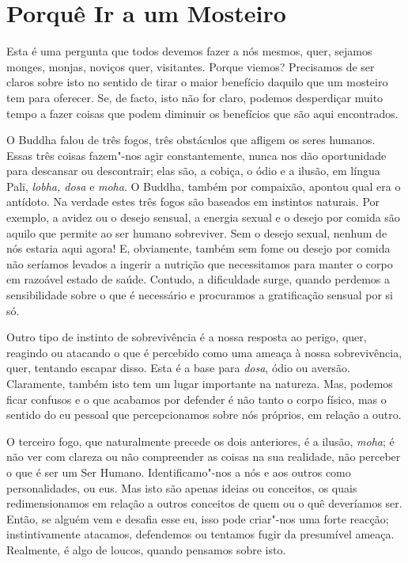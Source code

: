 \chapter{Porquê Ir a um Mosteiro}

Esta é uma pergunta que todos devemos fazer a nós mesmos, quer, sejamos
monges, monjas, noviços quer, visitantes. Porque viemos? Precisamos de
ser claros sobre isto no sentido de tirar o maior benefício daquilo que
um mosteiro tem para oferecer. Se, de facto, isto não for claro, podemos
desperdiçar muito tempo a fazer coisas que podem diminuir os benefícios
que são aqui encontrados.

O Buddha falou de três fogos, três obstáculos que afligem os seres
humanos. Essas três coisas fazem"-nos agir constantemente, nunca nos dão
oportunidade para descansar ou descontrair; elas são, a cobiça, o ódio e
a ilusão, em língua Palī, \emph{lobha, dosa} e \emph{moha}. O Buddha,
também por compaixão, apontou qual era o antídoto. Na verdade estes três
fogos são baseados em instintos naturais. Por exemplo, a avidez ou o
desejo sensual, a energia sexual e o desejo por comida são aquilo que
permite ao ser humano sobreviver. Sem o desejo sexual, nenhum de nós
estaria aqui agora! E, obviamente, também sem fome ou desejo por comida
não seríamos levados a ingerir a nutrição que necessitamos para manter o
corpo em razoável estado de saúde. Contudo, a dificuldade surge, quando
perdemos a sensibilidade sobre o que é necessário e procuramos a
gratificação sensual por si só.

Outro tipo de instinto de sobrevivência é a nossa resposta ao perigo,
quer, reagindo ou atacando o que é percebido como uma ameaça à nossa
sobrevivência, quer, tentando escapar disso. Esta é a base para
\emph{dosa}, ódio ou aversão. Claramente, também isto tem um lugar
importante na natureza. Mas, podemos ficar confusos e o que acabamos por
defender é não tanto o corpo físico, mas o sentido do eu pessoal que
percepcionamos sobre nós próprios, em relação a outro.

O terceiro fogo, que naturalmente precede os dois anteriores, é a
ilusão, \emph{moha}; é não ver com clareza ou não compreender as coisas
na sua realidade, não perceber o que é ser um Ser Humano.
Identificamo"-nos a nós e aos outros como personalidades, ou eus. Mas
isto são apenas ideias ou conceitos, os quais redimensionamos em relação
a outros conceitos de quem ou o quê deveríamos ser. Então, se alguém vem
e desafia esse eu, isso pode criar"-nos uma forte reacção;
instintivamente atacamos, defendemos ou tentamos fugir da presumível
ameaça. Realmente, é algo de loucos, quando pensamos sobre isto.

